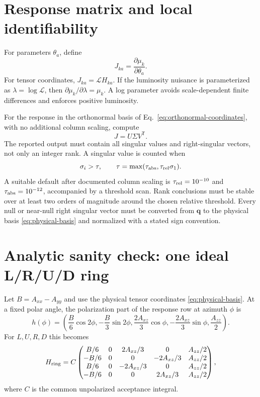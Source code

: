 \documentclass[11pt,a4paper]{article}
\newcommand{\vect}[1]{\bm{#1}}
\begin{document}
\section{Response matrix and local identifiability}

For parameters $\theta_a$, define
\begin{equation}
 J_{ka}=\frac{\partial\mu_k}{\partial\theta_a}.
\end{equation}
For tensor coordinates, $J_{ka}=\mathcal L H_{ka}$.  If the luminosity nuisance
is parameterized as $\lambda=\log\mathcal L$, then
$\partial\mu_k/\partial\lambda=\mu_k$.  A log parameter avoids scale-dependent
finite differences and enforces positive luminosity.

For the response in the orthonormal basis of Eq.~\eqref{eq:orthonormal-coordinates},
with no additional column scaling, compute
\begin{equation}
 J=U\Sigma V^{\mathsf T}.
\end{equation}
The reported output must contain all singular values and right-singular vectors,
not only an integer rank.  A singular value is counted when
\begin{equation}
 \sigma_i>\tau,\qquad
 \tau=\max(\tau_{\rm abs},\tau_{\rm rel}\sigma_1).
 \label{eq:rank-threshold}
\end{equation}
A suitable default after documented column scaling is
$\tau_{\rm rel}=10^{-10}$ and $\tau_{\rm abs}=10^{-12}$, accompanied by a
threshold scan.  Rank conclusions must be stable over at least two orders of
magnitude around the chosen relative threshold.  Every null or near-null right
singular vector must be converted from $\vect q$ to the physical basis
\eqref{eq:physical-basis} and normalized with a stated sign convention.

\section{Analytic sanity check: one ideal L/R/U/D ring}

Let $B=A_{xx}-A_{yy}$ and use the physical tensor coordinates
\eqref{eq:physical-basis}.  At a fixed polar angle, the polarization part of
the response row at azimuth $\phi$ is
\begin{equation}
 h(\phi)=
 \left(
 \frac{B}{6}\cos2\phi,
 -\frac{B}{3}\sin2\phi,
 \frac{2A_{xz}}{3}\cos\phi,
 -\frac{2A_{xz}}{3}\sin\phi,
 \frac{A_{zz}}{2}
 \right).
 \label{eq:ideal-row}
\end{equation}
For $L,U,R,D$ this becomes
\begin{equation}
 H_{\rm ring}=C
 \begin{pmatrix}
 B/6&0&2A_{xz}/3&0&A_{zz}/2\\
 -B/6&0&0&-2A_{xz}/3&A_{zz}/2\\
 B/6&0&-2A_{xz}/3&0&A_{zz}/2\\
 -B/6&0&0&2A_{xz}/3&A_{zz}/2
 \end{pmatrix},
 \label{eq:ring-matrix}
\end{equation}
where $C$ is the common unpolarized acceptance integral.
\end{document}
